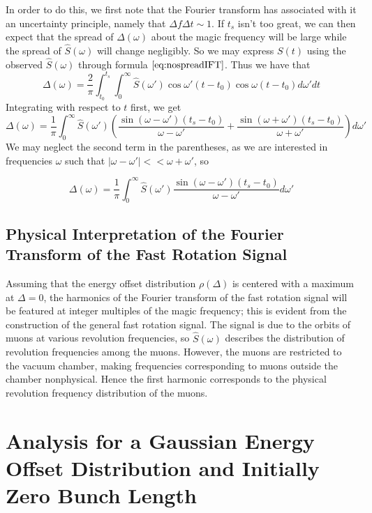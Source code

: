 In order to do this, we first note that the Fourier transform has associated with it an uncertainty principle, namely that $\Delta f\Delta t\sim1$. If $t_s$ isn't too great, we can then expect that the spread of $\Delta(\omega)$ about the magic frequency will be large while the spread of $\hat{S}(\omega)$ will change negligibly. So we may express $S(t)$ using the observed $\hat{S}(\omega)$ through formula$~\eqref{eq:nospreadIFT}$. Thus we have that \[\Delta(\omega)=\frac{2}{\pi}\int^{t_s}_{t_0}\int^{\infty}_0\hat{S}(\omega')\cos\omega'(t-t_0)\cos\omega(t-t_0)d\omega' dt\] Integrating with respect to $t$ first, we get \[\Delta(\omega)=\frac{1}{\pi}\int^{\infty}_0\hat{S}(\omega')\left(\frac{\sin(\omega-\omega')(t_s-t_0)}{\omega-\omega'}+\frac{\sin(\omega+\omega')(t_s-t_0)}{\omega+\omega'}\right)d\omega'\] We may neglect the second term in the parentheses, as we are interested in frequencies $\omega$ such that $|\omega-\omega'|<<\omega+\omega'$, so 

\begin{equation}
\Delta(\omega)=\frac{1}{\pi}\int^{\infty}_0\hat{S}(\omega')\frac{\sin(\omega-\omega')(t_s-t_0)}{\omega-\omega'}d\omega'
\label{eq:approxDelta}
\end{equation}

\subsection{Physical Interpretation of the Fourier Transform of the Fast Rotation Signal}

Assuming that the energy offset distribution $\rho(\Delta)$ is centered with a maximum at $\Delta=0$, the harmonics of the Fourier transform of the fast rotation signal will be featured at integer multiples of the magic frequency; this is evident from the construction of the general fast rotation signal. The signal is due to the orbits of muons at various revolution frequencies, so $\hat{S}(\omega)$ describes the distribution of revolution frequencies among the muons. However, the muons are restricted to the vacuum chamber, making frequencies corresponding to muons outside the chamber nonphysical. Hence the first harmonic corresponds to the physical revolution frequency distribution of the muons.

\section{Analysis for a Gaussian Energy Offset Distribution and Initially Zero Bunch Length}


